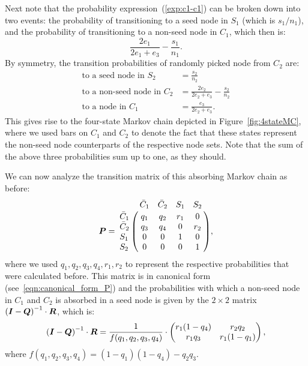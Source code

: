Next note that the probability expression~(\ref{exp:c1-c1}) can be broken down 
into two events: the probability of transitioning to a seed node 
in $S_1$ (which is $s_1 / n_1$), and the probability of transitioning 
to a non-seed node in $C_1$, which then is:
\begin{equation}\label{exp:non_seed_c1}
    \frac{2e_1}{2e_1 + e_3} - \frac{s_1}{n_1}.
\end{equation}
By symmetry, the transition
probabilities of randomly picked node from $C_2$ are:
\begin{align}
    \mbox{to a seed node in $S_2$}      & = \frac{s_2}{n_2} \\
    \mbox{to a non-seed node in $C_2$}  & = \frac{2e_2}{2e_2 + e_3} - \frac{s_2}{n_2} \\
    \mbox{to a node in $C_1$}           & = \frac{e_3}{2e_2 + e_3}.
\end{align}
This gives rise to the four-state Markov chain depicted in Figure~\ref{fig:4stateMC}, 
where we used bars on $C_1$ and $C_2$ to denote the fact that these 
states represent the non-seed node counterparts of the respective node sets.
Note that the sum of the above three probabilities sum up to one, as they should.

We can now analyze the transition matrix of this absorbing Markov chain as 
before:
\begin{equation}\label{eqn:4-state-matrix}
    \mat{P} =
    \bordermatrix{\text{}   & \bar{C}_1 & \bar{C}_2 & S_1 & S_2 \cr
                  \bar{C}_1 & q_1       &  q_2      & r_1 & 0   \cr
                  \bar{C}_2 & q_3       &  q_4      &  0  & r_2 \cr
                        S_1 &  0        &   0       &  1  &  0  \cr
                        S_2 &  0        &   0       &  0  &  1},
\end{equation}
where we used $q_1, q_2, q_3, q_4, r_1, r_2$ to represent the respective 
probabilities that were calculated before. This matrix is in canonical form 
(see~\ref{eqn:canonical_form_P}) and the probabilities with which a non-seed 
node in $C_1$ and $C_2$ is absorbed in a seed node is given by the $2 \times 2$ matrix 
${(\boldsymbol{I} - \boldsymbol{Q})}^{-1} \cdot \boldsymbol{R}$, which is:
\begin{equation}
    {(\ensuremath{\boldsymbol{I}} - \ensuremath{\boldsymbol{Q}})}^{-1} \cdot \boldsymbol{R} = \frac{1}{f(q_1, q_2, q_3, q_4)}
        \cdot \left ( \begin{matrix}
                            r_1 (1 - q_4) & r_2 q_2         \\  
                            r_1 q_3       & r_1 (1 - q_1)
                      \end{matrix} \right ),
\end{equation}
where $f(q_1, q_2, q_3, q_4) = (1 - q_1) (1 - q_4) - q_2 q_3$.

